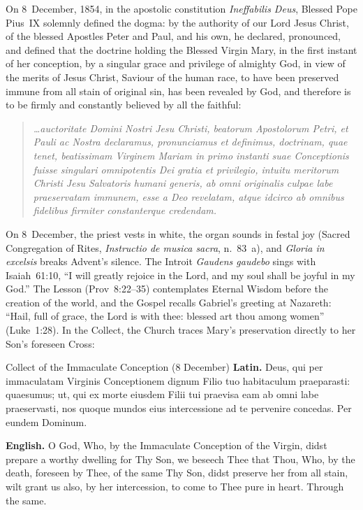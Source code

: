 On 8~December, 1854, in the apostolic constitution \textit{Ineffabilis
Deus}, Blessed Pope Pius~IX solemnly defined the dogma: by the authority
of our Lord Jesus Christ, of the blessed Apostles Peter and Paul, and
his own, he declared, pronounced, and defined that the doctrine holding
the Blessed Virgin Mary, in the first instant of her conception, by a
singular grace and privilege of almighty God, in view of the merits of
Jesus Christ, Saviour of the human race, to have been preserved immune
from all stain of original sin, has been revealed by God, and therefore
is to be firmly and constantly believed by all the faithful:

\begin{quote}
\textit{\dots auctoritate Domini Nostri Jesu Christi, beatorum
Apostolorum Petri, et Pauli ac Nostra declaramus, pronunciamus et
definimus, doctrinam, quae tenet, beatissimam Virginem Mariam in primo
instanti suae Conceptionis fuisse singulari omnipotentis Dei gratia et
privilegio, intuitu meritorum Christi Jesu Salvatoris humani generis, ab
omni originalis culpae labe praeservatam immunem, esse a Deo revelatam,
atque idcirco ab omnibus fidelibus firmiter constanterque credendam.}
\end{quote}

On 8~December, the priest vests in white, the organ sounds in festal joy
(Sacred Congregation of Rites, \textit{Instructio de musica sacra},
n.~83~a), and \textit{Gloria in excelsis} breaks Advent's silence. The
Introit \textit{Gaudens gaudebo} sings with Isaiah~61:10, ``I will
greatly rejoice in the Lord, and my soul shall be joyful in my God.''
The Lesson (Prov~8:22--35) contemplates Eternal Wisdom before the
creation of the world, and the Gospel recalls Gabriel's greeting at
Nazareth: ``Hail, full of grace, the Lord is with thee: blessed art thou
among women'' (Luke~1:28). In the Collect, the Church traces Mary's
preservation directly to her Son's foreseen Cross:

\begin{massbox}{Collect of the Immaculate Conception (8 December)}
\textbf{Latin.} Deus, qui per immaculatam Virginis Conceptionem dignum
Filio tuo habitaculum praeparasti: quaesumus; ut, qui ex morte eiusdem
Filii tui praevisa eam ab omni labe praeservasti, nos quoque mundos eius
intercessione ad te pervenire concedas. Per eundem Dominum.

\textbf{English.} O God, Who, by the Immaculate Conception of the Virgin,
didst prepare a worthy dwelling for Thy Son, we beseech Thee that Thou,
Who, by the death, foreseen by Thee, of the same Thy Son, didst preserve
her from all stain, wilt grant us also, by her intercession, to come to
Thee pure in heart. Through the same.
\end{massbox}

